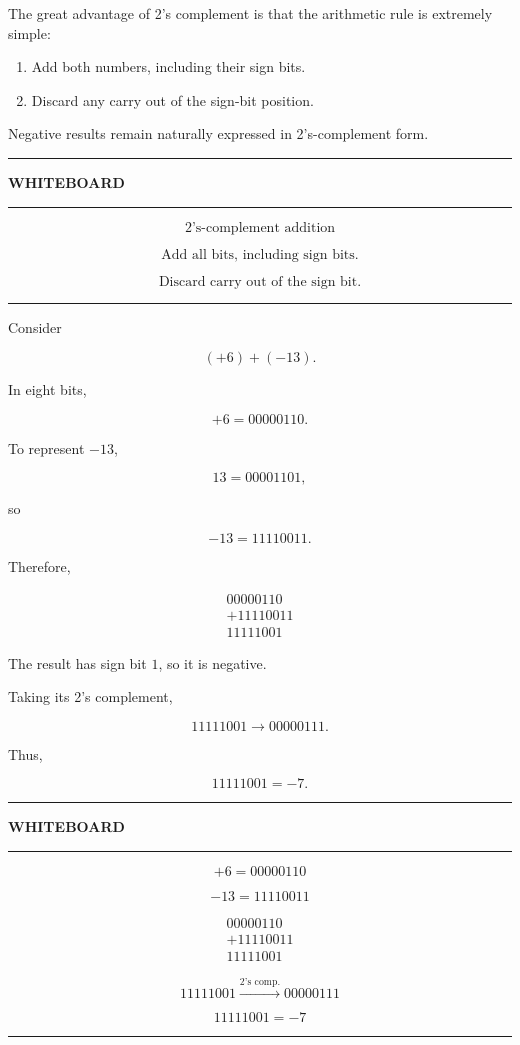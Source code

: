 \documentclass[11pt]{article}
\newenvironment{whiteboard}
{
    \par\medskip
    \begin{center}
    \begin{minipage}{0.94\textwidth}
    \hrule
    \vspace{0.4em}
    \textbf{\large WHITEBOARD}
    \vspace{0.3em}
    \hrule
    \vspace{0.7em}
}
{
    \vspace{0.5em}
    \hrule
    \end{minipage}
    \end{center}
    \medskip
}
\begin{document}
The great advantage of 2's complement is that the arithmetic rule is extremely
simple:

\begin{enumerate}
    \item Add both numbers, including their sign bits.
    \item Discard any carry out of the sign-bit position.
\end{enumerate}

Negative results remain naturally expressed in 2's-complement form.

\begin{whiteboard}
\[
\boxed{\text{2's-complement addition}}
\]

\[
\text{Add all bits, including sign bits.}
\]

\[
\text{Discard carry out of the sign bit.}
\]
\end{whiteboard}

Consider

\[
(+6)+(-13).
\]

In eight bits,

\[
+6=00000110.
\]

To represent \(-13\),

\[
13=00001101,
\]

so

\[
-13=11110011.
\]

Therefore,

\[
\begin{array}{r}
00000110\\
+11110011\\ \hline
11111001
\end{array}
\]

The result has sign bit \(1\), so it is negative.

Taking its 2's complement,

\[
11111001
\rightarrow
00000111.
\]

Thus,

\[
11111001=-7.
\]

\begin{whiteboard}
\[
+6=00000110
\]

\[
-13=11110011
\]

\[
\begin{array}{r}
00000110\\
+11110011\\ \hline
11111001
\end{array}
\]

\[
11111001\xrightarrow{\text{2's comp.}}00000111
\]

\[
\boxed{11111001=-7}
\]
\end{whiteboard}
\end{document}
